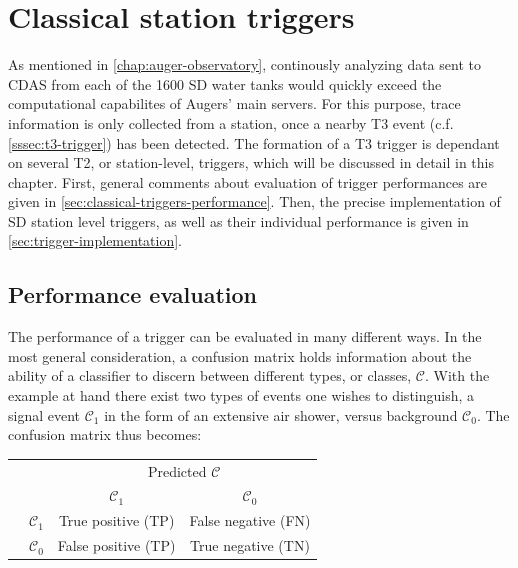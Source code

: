 
\chapter{Classical station triggers}
\label{chap:classical-triggers}

As mentioned in \autoref{chap:auger-observatory}, continously analyzing data sent to CDAS from each of the 1600 SD water tanks would quickly exceed the 
computational capabilites of Augers' main servers. For this purpose, trace information is only collected from a station, once a nearby T3 event 
(c.f. \autoref{sssec:t3-trigger}) has been detected. The formation of a T3 trigger is dependant on several T2, or station-level, triggers, which will
be discussed in detail in this chapter. First, general comments about evaluation of trigger performances are given in \autoref{sec:classical-triggers-performance}.
Then, the precise implementation of SD station level triggers, as well as their individual performance is given in \autoref{sec:trigger-implementation}.

\section{Performance evaluation}
\label{sec:classical-triggers-performance}

The performance of a trigger can be evaluated in many different ways. In the most general consideration, a confusion matrix holds information about the ability of 
a classifier to discern between different types, or classes, $\mathcal{C}$. With the example at hand there exist two types of events one wishes to distinguish, a 
signal event $\mathcal{C}_1$ in the form of an extensive air shower, versus background $\mathcal{C}_0$. The confusion matrix thus becomes:

\begingroup
\renewcommand{\arraystretch}{1.5}
\begin{center}
	\begin{tabular}{@{}cc c|c@{}}
		\multicolumn{1}{c}{} &\multicolumn{1}{c}{} &\multicolumn{2}{c}{\scriptsize Predicted $\mathcal{C}$ \normalsize} \\ 
		\multicolumn{1}{c}{} & 
		\multicolumn{1}{c}{} & 
		\multicolumn{1}{c}{$\mathcal{C}_1$} & 
		\multicolumn{1}{c}{$\mathcal{C}_0$} \\ 
		\cline{2-4}
		\multirow[c]{2}{*}{\rotatebox[origin=tr]{90}{\scriptsize True $\mathcal{C}$ \normalsize}}
		& $\mathcal{C}_1$  & True positive (TP) & False negative (FN)   \\
		\cline{3-4}
		& $\mathcal{C}_0$  & False positive (TP) & True negative (TN) \\ 
		\cline{2-4}
	\end{tabular}
\end{center}
\endgroup


